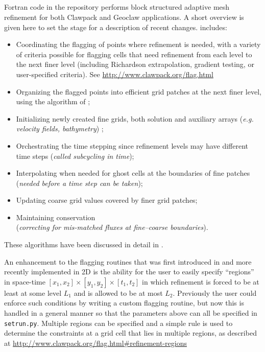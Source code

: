 %
%
%
\pagebreak
\subsection{\amrclaw}
Fortran code in the \amrclaw repository performs block structured adaptive mesh
refinement \cite{BO,BC} for both 
Clawpack and Geoclaw  applications.
A short overview is given
here to set the stage for a description of recent changes.
\amrclaw includes: 
\begin{itemize}
\item
Coordinating the flagging of points where refinement is needed,
with a variety of criteria possible for flagging cells that need refinement
from each level to the next finer level (including Richardson extrapolation,
gradient testing, or user-specified criteria).  See
\url{http://www.clawpack.org/flag.html}
\item
Organizing the flagged points into efficient grid
patches at the next finer level, using the algorithm of
\cite{mjb-rig:cluster};
\item
Initializing newly created fine grids, both solution and
auxiliary arrays ({\em e.g. velocity fields, bathymetry}) ;
\item
Orchestrating the time stepping since refinement levels may have
different time steps ({\em called subcycling in time});
\item
Interpolating when needed for ghost cells at the boundaries of fine patches \\
({\em needed before a time step can be taken});
\item
Updating coarse grid values covered by finer grid patches;
\item
Maintaining conservation\\
({\em correcting for mis-matched fluxes at fine--coarse boundaries}).
\end{itemize}

These algorithms have been discussed in detail in
\cite{mjb-rjl:amrclaw,LeVequeGeorgeBerger:an11}. 

An enhancement to the flagging routines that was first introduced in
\geoclaw and more recently implemented in 2D \amrclaw {}
is the ability for the user to easily specify ``regions'' in space-time
$[x_1,x_2] \times [y_1,y_2] \times [t_1,t_2]$ in which refinement is forced to
be at least at some level $L_1$ and is allowed to be at most $L_2$.
Previously the user could enforce such conditions by writing a custom
flagging routine, but now this is handled in a general manner so that the
parameters above can all be specified in \texttt{setrun.py}.  Multiple
regions can be specified and a simple rule is used to determine the
constraints at a grid cell that lies in multiple regions, as described at
\url{http://www.clawpack.org/flag.html#refinement-regions}

